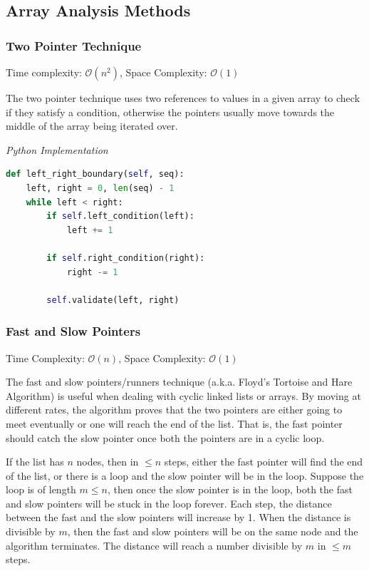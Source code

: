 \documentclass{article}
\newcommand{\bigO}{\mathcal{O}}
\begin{document}
    \subsection{Array Analysis Methods}
    
    \subsubsection{Two Pointer Technique}
    Time complexity: $\bigO(n^2)$, Space Complexity: $\bigO(1)$
    
    The two pointer technique uses two references to values in a given array to check if they satisfy a condition, otherwise the pointers usually move towards the middle of the array being iterated over.
    
\vspace{8pt} \emph{Python Implementation}
\begin{lstlisting}[language=Python]
def left_right_boundary(self, seq):
    left, right = 0, len(seq) - 1
    while left < right:
        if self.left_condition(left):
            left += 1

        if self.right_condition(right):
            right -= 1

        self.validate(left, right)
\end{lstlisting}
    
    \subsubsection{Fast and Slow Pointers}
    Time Complexity: $\bigO(n)$, Space Complexity: $\bigO(1)$
    
    The fast and slow pointers/runners technique (a.k.a. Floyd’s Tortoise and Hare Algorithm) is useful when dealing with cyclic linked lists or arrays. By moving at different rates, the algorithm proves that the two pointers are either going to meet eventually or one will reach the end of the list. That is, the fast pointer should catch the slow pointer once both the pointers are in a cyclic loop. 
    
    If the list has $n$ nodes, then in $\leq n$ steps, either the fast pointer will find the end of the list, or there is a loop and the slow pointer will be in the loop. Suppose the loop is of length $m \leq n$, then once the slow pointer is in the loop, both the fast and slow pointers will be stuck in the loop forever. Each step, the distance between the fast and the slow pointers will increase by 1. When the distance is divisible by $m$, then the fast and slow pointers will be on the same node and the algorithm terminates. The distance will reach a number divisible by $m$ in $\leq m$ steps.
\end{document}
